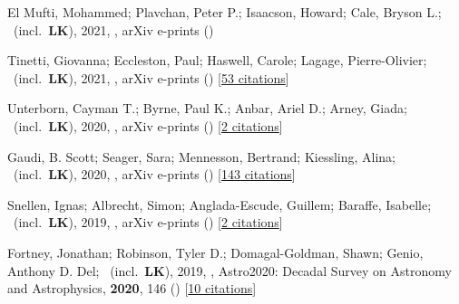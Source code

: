 \item[{\color{numcolor}\scriptsize12}] El Mufti, Mohammed; Plavchan, Peter P.; Isaacson, Howard; Cale, Bryson L.; \etal\ (incl.\ \textbf{LK}), 2021, , arXiv e-prints ()

\item[{\color{numcolor}\scriptsize11}] Tinetti, Giovanna; Eccleston, Paul; Haswell, Carole; Lagage, Pierre-Olivier; \etal\ (incl.\ \textbf{LK}), 2021, , arXiv e-prints () [\href{https://ui.adsabs.harvard.edu/abs/2021arXiv210404824T}{53 citations}]

\item[{\color{numcolor}\scriptsize10}] Unterborn, Cayman T.; Byrne, Paul K.; Anbar, Ariel D.; Arney, Giada; \etal\ (incl.\ \textbf{LK}), 2020, , arXiv e-prints () [\href{https://ui.adsabs.harvard.edu/abs/2020arXiv200708665U}{2 citations}]

\item[{\color{numcolor}\scriptsize9}] Gaudi, B. Scott; Seager, Sara; Mennesson, Bertrand; Kiessling, Alina; \etal\ (incl.\ \textbf{LK}), 2020, , arXiv e-prints () [\href{https://ui.adsabs.harvard.edu/abs/2020arXiv200106683G}{143 citations}]

\item[{\color{numcolor}\scriptsize8}] Snellen, Ignas; Albrecht, Simon; Anglada-Escude, Guillem; Baraffe, Isabelle; \etal\ (incl.\ \textbf{LK}), 2019, , arXiv e-prints () [\href{https://ui.adsabs.harvard.edu/abs/2019arXiv190801803S}{2 citations}]

\item[{\color{numcolor}\scriptsize7}] Fortney, Jonathan; Robinson, Tyler D.; Domagal-Goldman, Shawn; Genio, Anthony D. Del; \etal\ (incl.\ \textbf{LK}), 2019, , Astro2020: Decadal Survey on Astronomy and Astrophysics, \textbf{2020}, 146 () [\href{https://ui.adsabs.harvard.edu/abs/2019astro2020T.146F}{10 citations}]

